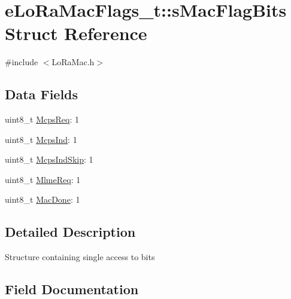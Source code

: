 \hypertarget{structeLoRaMacFlags__t_1_1sMacFlagBits}{}\section{e\+Lo\+Ra\+Mac\+Flags\+\_\+t\+:\+:s\+Mac\+Flag\+Bits Struct Reference}
\label{structeLoRaMacFlags__t_1_1sMacFlagBits}


{\ttfamily \#include $<$Lo\+Ra\+Mac.\+h$>$}

\subsection*{Data Fields}
\begin{DoxyCompactItemize}
\item 
uint8\+\_\+t \hyperlink{structeLoRaMacFlags__t_1_1sMacFlagBits_a727c79197d8a2483caae1cc27bec7156}{Mcps\+Req}\+: 1
\item 
uint8\+\_\+t \hyperlink{structeLoRaMacFlags__t_1_1sMacFlagBits_a5efd6856c102ada444a52a4a7051b356}{Mcps\+Ind}\+: 1
\item 
uint8\+\_\+t \hyperlink{structeLoRaMacFlags__t_1_1sMacFlagBits_afc90ee640a2c201e43569e2bd50ec818}{Mcps\+Ind\+Skip}\+: 1
\item 
uint8\+\_\+t \hyperlink{structeLoRaMacFlags__t_1_1sMacFlagBits_aa8fd4d4d7a676bc65424243f1d4632dc}{Mlme\+Req}\+: 1
\item 
uint8\+\_\+t \hyperlink{structeLoRaMacFlags__t_1_1sMacFlagBits_a56fbdd840050dee917881e9cfb32dc30}{Mac\+Done}\+: 1
\end{DoxyCompactItemize}


\subsection{Detailed Description}
Structure containing single access to bits 

\subsection{Field Documentation}
\mbox{\label{structeLoRaMacFlags__t_1_1sMacFlagBits_a56fbdd840050dee917881e9cfb32dc30}} 
